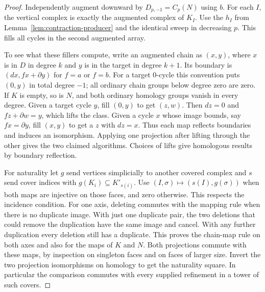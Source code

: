 \begin{proof}
Independently augment downward by $D_{p,-1}=C_p(N)$ using $b$. For
each $I$, the vertical complex is exactly the augmented complex of $K_I$.
Use the $h_I$ from Lemma~\ref{lem:contraction-producer} and the identical
sweep in decreasing $p$. This fills all cycles in the second augmented
array.

To see what these fillers compute, write an augmented chain as $(x,y)$,
where $x$ is in $D$ in degree $k$ and $y$ is in the target in degree
$k+1$. Its boundary is $(dx,f x+\partial y)$ for $f=a$ or $f=b$.
For a target $0$-cycle this convention puts $(0,y)$ in total degree
$-1$; all ordinary chain groups below degree zero are zero. If $K$ is
empty, so is $N$, and both ordinary homology groups vanish in every
degree. Given a target cycle $y$, fill $(0,y)$ to get $(z,w)$. Then $dz=0$
and $fz+\partial w=y$, which lifts the class. Given a cycle $x$ whose
image bounds, say $fx=\partial y$, fill $(x,y)$ to get a $z$ with
$dz=x$. Thus each map reflects boundaries and induces an isomorphism.
Applying one projection after lifting through the other gives the two
claimed algorithms. Choices of lifts give homologous results by boundary
reflection.

For naturality let $g$ send vertices simplicially to another covered
complex and $s$ send cover indices with $g(K_i)\subseteq K'_{s(i)}$.
Use $(I,\sigma)\mapsto(s(I),g(\sigma))$ when both maps are injective
on those faces, and zero otherwise. This respects the incidence condition.
For one axis, deleting commutes with the mapping rule when there is no
duplicate image. With just one duplicate pair, the two deletions that
could remove the duplication have the same image and cancel. With any
further duplication every deletion still has a duplicate. This proves
the chain-map rule on both axes and also for the maps of $K$ and $N$.
Both projections commute with these maps, by inspection on singleton
faces and on faces of larger size. Invert the two projection isomorphisms
on homology to get the naturality square. In particular the comparison
commutes with every supplied refinement in a tower of such covers.
\end{proof}

